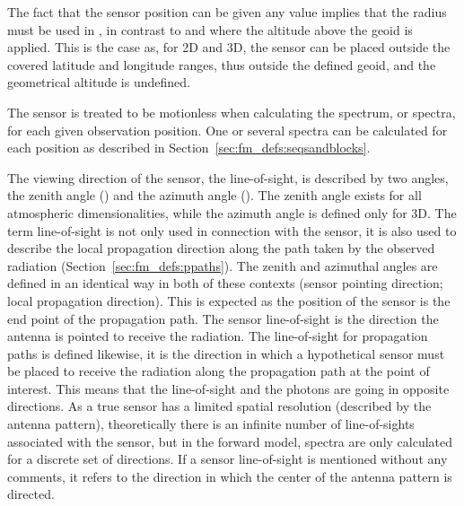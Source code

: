 The fact that the sensor position can be given any value implies that
the radius must be used in , in contrast to
 and  where the altitude
above the geoid is applied. This is the case as, for 2D and 3D, the
sensor can be placed outside the covered latitude and longitude
ranges, thus outside the defined geoid, and the geometrical altitude is
undefined. 

The sensor is treated to be motionless when calculating the spectrum,
or spectra, for each given observation position. One or several
spectra can be calculated for each position as described in
Section~\ref{sec:fm_defs:seqsandblocks}.


\label{sec:fm_defs:los}

The viewing direction of the sensor, the line-of-sight, is described
by two angles, the zenith angle (\ZntAng) and the azimuth angle
(\AzmAng). The zenith angle exists for all atmospheric
dimensionalities, while the azimuth angle is defined only for 3D.
The term line-of-sight is not only used in connection with the sensor,
it is also used to describe the local propagation direction along the
path taken by the observed radiation
(Section~\ref{sec:fm_defs:ppaths}).  The zenith and azimuthal angles
are defined in an identical way in both of these contexts (sensor
pointing direction; local propagation direction). This is expected as
the position of the sensor is the end point of the propagation path.
The sensor line-of-sight is the direction the antenna is pointed to
receive the radiation. The line-of-sight for propagation paths is
defined likewise, it is the direction in which a hypothetical sensor
must be placed to receive the radiation along the propagation path at
the point of interest. This means that the line-of-sight and the
photons are going in opposite directions. As a true sensor has a
limited spatial resolution (described by the antenna pattern),
theoretically there is an infinite number of line-of-sights associated
with the sensor, but in the forward model, spectra are only calculated
for a discrete set of directions. If a sensor line-of-sight is
mentioned without any comments, it refers to the direction in which
the center of the antenna pattern is directed.

